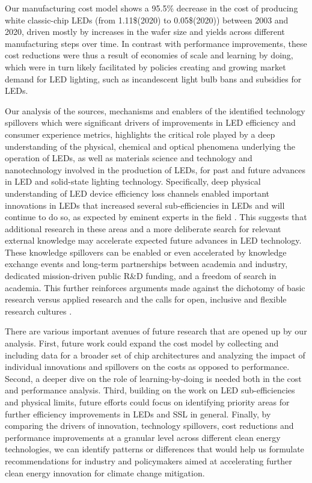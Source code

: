 \documentclass[parskip=full]{article}
\begin{document}
Our manufacturing cost model shows a 95.5\% decrease in the cost of producing white classic-chip LEDs (from 1.11\$(2020) to 0.05\$(2020)) between 2003 and 2020, driven mostly by increases in the wafer size and yields across different manufacturing steps over time. In contrast with performance improvements, these cost reductions were thus a result of economies of scale and learning by doing,  which were in turn likely facilitated by policies creating and growing market demand for LED lighting, such as incandescent light bulb bans and subsidies for LEDs.

Our analysis of the sources, mechanisms and enablers of the identified technology spillovers which were significant drivers of improvements in LED efficiency and consumer experience metrics, highlights the critical role played by a deep understanding of the physical, chemical and optical phenomena underlying the operation of LEDs, as well as materials science and technology and nanotechnology involved in the production of LEDs, for past and future advances in LED and solid-state lighting technology. Specifically, deep physical understanding of LED device efficiency loss channels enabled important innovations in LEDs that increased several sub-efficiencies in LEDs and will continue to do so, as expected by eminent experts in the field \cite{Weisbuch2020}. This suggests that additional research in these areas and a more deliberate search for relevant external knowledge may accelerate expected future advances in LED technology. These knowledge spillovers can be enabled or even accelerated by knowledge exchange events and long-term partnerships between academia and industry, dedicated mission-driven public R\&D funding, and a freedom of search in academia. This further reinforces arguments made against the dichotomy of basic research versus applied research \cite{narayanamurti2016cycles,narayanamurti2021genesis} and the calls for open, inclusive and flexible research cultures \cite{Stephan2021}.

There are various important avenues of future research that are opened up by our analysis. First, future work could expand the cost model by collecting and including data for a broader set of chip architectures and analyzing the impact of individual innovations and spillovers on the costs as opposed to performance. Second, a deeper dive on the role of learning-by-doing is needed both in the cost and performance analysis. Third, building on the work on LED sub-efficiencies and physical limits, future efforts could focus on identifying priority areas for further efficiency improvements in LEDs and SSL in general. Finally, by comparing the drivers of innovation, technology spillovers, cost reductions and performance improvements at a granular level across different clean energy technologies, we can identify patterns or differences that would help us formulate recommendations for industry and policymakers aimed at accelerating further clean energy innovation for climate change mitigation. 
\end{document}

